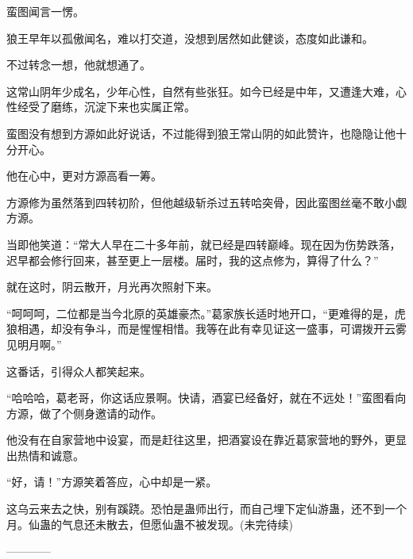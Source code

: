 \begin{this_body}
蛮图闻言一愣。

狼王早年以孤傲闻名，难以打交道，没想到居然如此健谈，态度如此谦和。

不过转念一想，他就想通了。

这常山阴年少成名，少年心性，自然有些张狂。如今已经是中年，又遭逢大难，心性经受了磨练，沉淀下来也实属正常。

蛮图没有想到方源如此好说话，不过能得到狼王常山阴的如此赞许，也隐隐让他十分开心。

他在心中，更对方源高看一筹。

方源修为虽然落到四转初阶，但他越级斩杀过五转哈突骨，因此蛮图丝毫不敢小觑方源。

当即他笑道：“常大人早在二十多年前，就已经是四转巅峰。现在因为伤势跌落，迟早都会修行回来，甚至更上一层楼。届时，我的这点修为，算得了什么？”

就在这时，阴云散开，月光再次照射下来。

“呵呵呵，二位都是当今北原的英雄豪杰。”葛家族长适时地开口，“更难得的是，虎狼相遇，却没有争斗，而是惺惺相惜。我等在此有幸见证这一盛事，可谓拨开云雾见明月啊。”

这番话，引得众人都笑起来。

“哈哈哈，葛老哥，你这话应景啊。快请，酒宴已经备好，就在不远处！”蛮图看向方源，做了个侧身邀请的动作。

他没有在自家营地中设宴，而是赶往这里，把酒宴设在靠近葛家营地的野外，更显出热情和诚意。

“好，请！”方源笑着答应，心中却是一紧。

这乌云来去之快，别有蹊跷。恐怕是蛊师出行，而自己埋下定仙游蛊，还不到一个月。仙蛊的气息还未散去，但愿仙蛊不被发现。(未完待续)

------------

\end{this_body}

